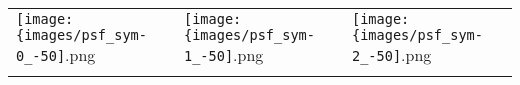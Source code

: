  \begin{tabular}{lll}
\texttt{[image: \{images/psf\_sym-0\_-50]}.png} &\texttt{[image: \{images/psf\_sym-1\_-50]}.png} &\texttt{[image: \{images/psf\_sym-2\_-50]}.png} 
 \\ \hfill\end{tabular}